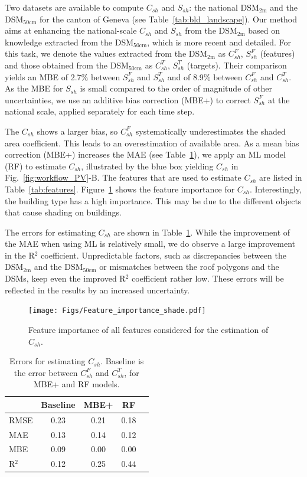 Two datasets are available to compute $C_{sh}$ and $S_{sh}$: the national DSM$_{2\text{m}}$ and the DSM$_{50\text{cm}}$ for the canton of Geneva (see Table~\ref{tab:bld_landscape}). Our method aims at enhancing the national-scale $C_{sh}$ and $S_{sh}$ from the DSM$_{2\text{m}}$ based on knowledge extracted from the DSM$_{50\text{cm}}$, which is more recent and detailed. For this task, we denote the values extracted from the DSM$_{2\text{m}}$ as $C_{sh}^F$, $S_{sh}^F$ (features) and those obtained from the DSM$_{50\text{cm}}$ as $C_{sh}^T$, $S_{sh}^T$ (targets).
%
Their comparison yields an MBE of 2.7\% between $S_{sh}^F$ and $S_{sh}^T$ and of 8.9\% between $C_{sh}^F$ and $C_{sh}^T$. As the MBE for $S_{sh}$ is small compared to the order of magnitude of other uncertainties, we use an additive bias correction (MBE+) to correct $S_{sh}^F$ at the national scale, applied separately for each time step. 

The $C_{sh}$ shows a larger bias, so $C_{sh}^F$ systematically underestimates the shaded area coefficient. This leads to an overestimation of available area. 
As a mean bias correction (MBE+) increases the MAE (see Table~\ref{tab:errors_Csh}), we apply an ML model (RF) to estimate $C_{sh}$, illustrated by the blue box yielding $C_{sh}$ in Fig.~\ref{fig:workflow_PV}-B. 
The features that are used to estimate  $C_{sh}$ are listed in Table~\ref{tab:features}.
Figure~\ref{fig:RF_Csh} shows the feature importance for $C_{sh}$. Interestingly, the building type has a high importance. This may be due to the different objects that cause shading on buildings. 

The errors for estimating $C_{sh}$ are shown in Table~\ref{tab:errors_Csh}. While the improvement of the MAE when using ML is relatively small, we do observe a large improvement in the R$^2$ coefficient.
Unpredictable factors, such as discrepancies between the DSM$_{2\text{m}}$ and the DSM$_{50\text{cm}}$ or mismatches between the roof polygons and the DSMs, keep even the improved R$^2$ coefficient rather low. 
These errors will be reflected in the results by an increased uncertainty.

\begin{figure}[tb]
\centering
\texttt{[image: Figs/Feature\_importance\_shade.pdf]}  
\caption{Feature importance of all features considered for the estimation of $C_{sh}$.}
\label{fig:RF_Csh}
\end{figure}

\begin{table}[tb]
\centering
\footnotesize
\caption{Errors for estimating $C_{sh}$. Baseline is the error between $C_{sh}^F$ and $C_{sh}^T$, for MBE+ and RF models.}
\label{tab:errors_Csh}
\begin{tabular}{lcccc}
\hline
      & \textbf{Baseline} & \textbf{MBE+} & \textbf{RF}   \\ \hline
RMSE  & 0.23     & 0.21  & 0.18 \\
MAE   & 0.13     & 0.14  & 0.12 \\
MBE   & 0.09     & 0.00  & 0.00 \\
R$^2$ & 0.12     & 0.25  & 0.44 \\ \hline
\end{tabular}
\end{table}

